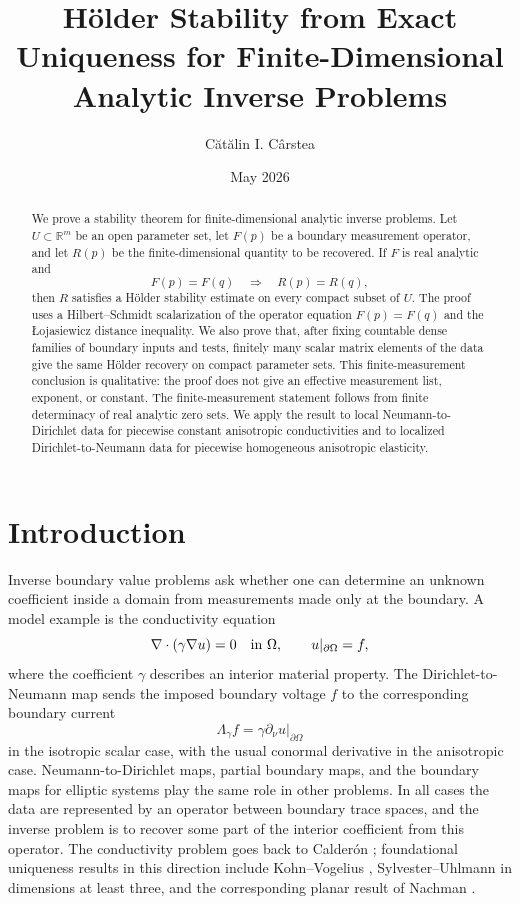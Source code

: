 \documentclass[12pt,oneside]{amsart}
\title[Stability from Uniqueness for Inverse Problems]{H\"older Stability from Exact Uniqueness for Finite-Dimensional Analytic Inverse Problems}
\author[C. I. C\^{a}rstea]{C\u{a}t\u{a}lin I. C\^{a}rstea}
\date{May 2026}
\newcommand{\R}{\mathbb R}
\begin{document}
\begin{abstract}
We prove a stability theorem for finite-dimensional analytic inverse problems.  Let
\(U\subset\R^m\) be an open parameter set, let \(F(p)\) be a boundary measurement
operator, and let \(R(p)\) be the finite-dimensional quantity to be recovered.  If
\(F\) is real analytic and
\[
        F(p)=F(q)\quad\Longrightarrow\quad R(p)=R(q),
\]
then \(R\) satisfies a H\"older stability estimate on every compact subset of \(U\).
The proof uses a Hilbert--Schmidt scalarization of the operator equation
\(F(p)=F(q)\) and the \L{}ojasiewicz distance inequality.  We also prove that,
after fixing countable dense families of boundary inputs and tests, finitely many
scalar matrix elements of the data give the same H\"older recovery on compact
parameter sets.  This finite-measurement conclusion is qualitative: the proof does
not give an effective measurement list, exponent, or constant.  The
finite-measurement statement follows from finite determinacy of real analytic
zero sets.  We apply the result to local Neumann-to-Dirichlet
data for piecewise constant anisotropic conductivities and to localized
Dirichlet-to-Neumann data for piecewise homogeneous anisotropic elasticity.
\end{abstract}

\maketitle

\section{Introduction}

Inverse boundary value problems ask whether one can determine an unknown
coefficient inside a domain from measurements made only at the boundary.  A
model example is the conductivity equation
\[
        \nabla\cdot(\gamma\nabla u)=0\quad \hbox{in }\Omega,
        \qquad u|_{\partial\Omega}=f,
\]
where the coefficient \(\gamma\) describes an interior material property.  The
Dirichlet-to-Neumann map sends the imposed boundary voltage \(f\) to the
corresponding boundary current
\[
        \Lambda_\gamma f = \gamma \partial_\nu u|_{\partial\Omega}
\]
in the isotropic scalar case, with the usual conormal derivative in the
anisotropic case.  Neumann-to-Dirichlet maps, partial boundary maps, and the
boundary maps for elliptic systems play the same role in other problems.  In
all cases the data are represented by an operator between boundary trace spaces,
and the inverse problem is to recover some part of the interior coefficient from
this operator.  The conductivity problem goes back to Calder\'on
\cite{Calderon1980}; foundational uniqueness results in this direction include
Kohn--Vogelius \cite{KohnVogelius1984,KohnVogelius1985},
Sylvester--Uhlmann \cite{SylvesterUhlmann1987} in dimensions at least three,
and the corresponding planar result of Nachman \cite{Nachman1996}.
\end{document}

